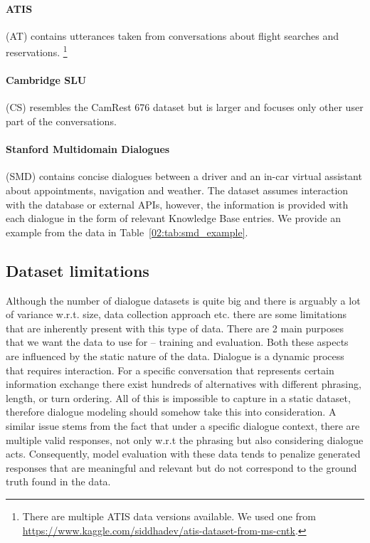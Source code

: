 \paragraph{ATIS} (AT) \cite{hemphill_atis_1990} contains utterances taken from conversations about flight searches and reservations. \footnote{There are multiple ATIS data versions available. We used one from \url{https://www.kaggle.com/siddhadev/atis-dataset-from-ms-cntk}.}
\paragraph{Cambridge SLU} (CS) \cite{henderson2012discriminative} resembles the CamRest 676 dataset but is larger and focuses only other user part of the conversations.

\paragraph{Stanford Multidomain Dialogues} (SMD) \cite{eric-etal-2017-key} contains concise dialogues between a driver and an in-car virtual assistant about appointments, navigation and weather.
The dataset assumes interaction with the database or external APIs, however, the information is provided with each dialogue in the form of relevant Knowledge Base entries.
We provide an example from the data in Table~\ref{02:tab:smd_example}.

\subsection{Dataset limitations}
\label{02:sec:data-limits}
Although the number of dialogue datasets is quite big and there is arguably a lot of variance w.r.t. size, data collection approach etc. there are some limitations that are inherently present with this type of data.
There are 2 main purposes that we want the data to use for -- training and evaluation.
Both these aspects are influenced by the static nature of the data.
Dialogue is a dynamic process that requires interaction.
For a specific conversation that represents certain information exchange there exist hundreds of alternatives with different phrasing, length, or turn ordering.
All of this is impossible to capture in a static dataset, therefore dialogue modeling should somehow take this into consideration.
A similar issue stems from the fact that under a specific dialogue context, there are multiple valid responses, not only w.r.t the phrasing but also considering dialogue acts.
Consequently, model evaluation with these data tends to penalize generated responses that are meaningful and relevant but do not correspond to the ground truth found in the data.

